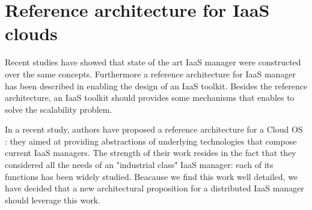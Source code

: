 \section{Reference architecture for IaaS clouds}

Recent studies have showed that state of the art IaaS manager \cite{peng:2009}
were constructed over the same concepts. Furthermore a reference architecture 
for IaaS manager has been described in \cite{moreno2012iaas} enabling the design
of an IaaS toolkit. Besides the reference architecture, an IaaS toolkit should
provides some mechanisms that enables to solve the scalability problem.

In a recent study, authors have proposed a reference architecture for 
a Cloud OS \cite{moreno2012iaas}: they aimed at providing abstractions of 
underlying technologies that compose current IaaS managers. The strength of 
their work resides in the fact that they considered all the needs of an 
"industrial class" IaaS manager: each of its functions has been widely studied.
Beacause we find this work well detailed, we have decided that a new 
architectural proposition for a distributed IaaS manager should leverage this 
work.